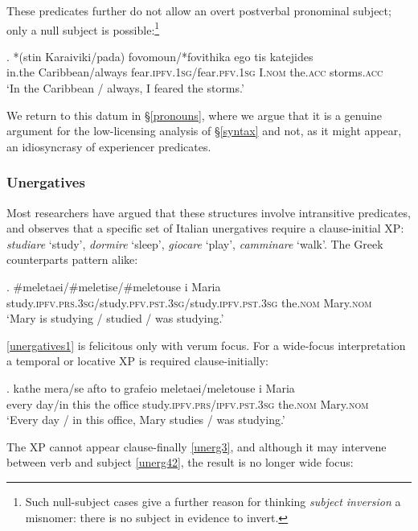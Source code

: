 \documentclass[11pt]{article}
\newcommand{\pfv}{\textsc{pfv}\xspace}
\newcommand{\ipfv}{\textsc{ipfv}\xspace}
\begin{document}
These predicates further do not allow an overt postverbal pronominal subject; only a null subject is possible:\footnote{Such null-subject cases give a further reason for thinking \emph{subject inversion} a misnomer: there is no subject in evidence to invert.}

\exg. *(stin Karaiviki/pada) fovomoun/*fovithika ego tis katejides\\
in.the Caribbean/always fear.\ipfv.1\textsc{sg}/fear.\pfv.1\textsc{sg} I.\textsc{nom} the.\textsc{acc} storms.\textsc{acc}\\ \label{roussou-tsimpli9}
`In the Caribbean / always, I feared the storms.'

We return to this datum in \S\ref{pronouns}, where we argue that it is a genuine argument for the low-licensing analysis of \S\ref{syntax} and not, as it might appear, an idiosyncrasy of experiencer predicates.

\subsubsection{Unergatives}

Most researchers have argued that these structures involve intransitive predicates, and \citet{pinto:97} observes that a specific set of Italian unergatives require a clause-initial XP: \emph{studiare} `study', \emph{dormire} `sleep', \emph{giocare} `play', \emph{camminare} `walk'.  The Greek counterparts pattern alike:

\exg. \#meletaei/\#meletise/\#meletouse i Maria\\
study.\ipfv.\textsc{prs}.3\textsc{sg}/study.\pfv.\textsc{pst}.3\textsc{sg}/study.\ipfv.\textsc{pst}.3\textsc{sg} the.\textsc{nom} Mary.\textsc{nom}\\ \label{unergatives1}
`Mary is studying / studied / was studying.'

\ref{unergatives1} is felicitous only with verum focus.  For a wide-focus interpretation a temporal or locative XP is required clause-initially:

\exg. kathe mera/se afto to grafeio meletaei/meletouse i Maria\\
every day/in this the office study.\ipfv.\textsc{prs}/\ipfv.\textsc{pst}.3\textsc{sg} the.\textsc{nom} Mary.\textsc{nom}\\ \label{unergatives2}
`Every day / in this office, Mary studies / was studying.'

The XP cannot appear clause-finally \ref{unerg3}, and although it may intervene between verb and subject \ref{unerg42}, the result is no longer wide focus:
\end{document}
